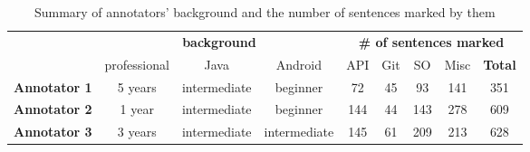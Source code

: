 \begin{table}[H]
\centering    
\caption{Summary of annotators' background and the number of sentences marked by them}
\label{tbl:corpus-summary-per-annotator}
\begin{scriptsize}
\begin{threeparttable}
\begin{tabular}{lcccccccc}




& \multicolumn{3}{c}{\textbf{background}}
& \multicolumn{5}{c}{\textbf{\# of sentences marked}}
\\ \cmidrule(l){2-4} \cmidrule(l){5-9} 



& professional & Java & Android
& API & Git & SO & Misc & \textbf{Total} 
\\

\hline


\textbf{Annotator 1}
& 5 years & intermediate & beginner
& 72 & 45 & 93 & 141 & 351 \\




\textbf{Annotator 2}
& 1 year & intermediate & beginner
& 144 & 44 & 143 & 278 & 609 \\




\textbf{Annotator 3}
& 3 years & intermediate & intermediate
& 145 & 61 & 209 & 213 & 628 \\

\hline



\end{tabular}
\end{threeparttable}
\end{scriptsize}
\end{table}

